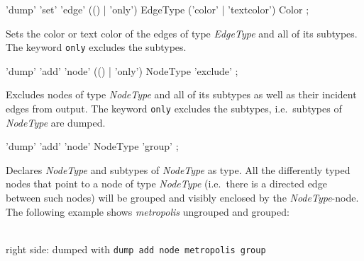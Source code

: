 \begin{rail}
  'dump' 'set' 'edge' (() | 'only') EdgeType ('color' | 'textcolor') Color ;
\end{rail}
Sets the color or text color of the edges of type \emph{EdgeType} and all of its subtypes. The keyword \texttt{only} excludes the subtypes.

\begin{rail}
  'dump' 'add' 'node' (() | 'only') NodeType 'exclude' ;
\end{rail}
Excludes nodes of type \emph{NodeType} and all of its subtypes as well as their incident edges from output. The keyword \texttt{only} excludes the subtypes, i.e.\ subtypes of \emph{NodeType} are dumped.

\begin{rail}
  'dump' 'add' 'node' NodeType 'group' ;
\end{rail}
Declares \emph{NodeType} and subtypes of \emph{NodeType} as  type. All the differently typed nodes that point to a node of type \emph{NodeType} (i.e.\ there is a directed edge between such nodes) will be grouped and visibly enclosed by the \emph{NodeType}-node.
The following example shows \emph{metropolis} ungrouped and grouped:
\begin{center}
    \hfill {}\\
  {\small right side: dumped with \texttt{dump add node metropolis group}}
\end{center}


